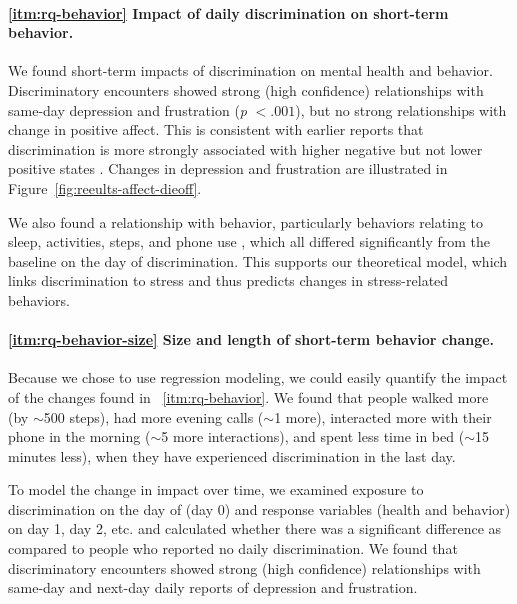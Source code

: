 \paragraph{\ref{itm:rq-behavior} Impact of daily discrimination on short-term behavior.} We found short-term impacts of discrimination on mental health and behavior. Discriminatory encounters showed strong (high confidence) relationships with same-day depression and frustration (\textit{p} $<.001$), but no strong relationships with change in positive affect. This is consistent with earlier reports that discrimination is more strongly associated with higher negative but not lower positive states \citep{Schmitt:2014}. Changes in depression and frustration are illustrated in Figure~\ref{fig:reeults-affect-dieoff}.  

We also found a relationship with behavior, particularly behaviors relating to sleep, activities, steps, and phone use , which all differed significantly from the baseline on the day of discrimination. This supports our theoretical model, which links discrimination to stress and thus predicts changes in stress-related behaviors. 

\paragraph{\ref{itm:rq-behavior-size} Size and length of short-term behavior change.}

Because we chose to use regression modeling, we could easily quantify the impact of the changes found in ~\ref{itm:rq-behavior}. We found that people walked more (by $\sim$500 steps), had more evening calls ($\sim$1 more), interacted more with their phone in the morning ($\sim$5 more interactions), and spent less time in bed ($\sim$15 minutes less), when they have experienced discrimination in the last day. 

To model the change in impact over time, we examined exposure to discrimination on the day of (day 0) and response variables (health and behavior) on day 1, day 2, etc. and calculated whether there was a significant difference as compared to people who reported no daily discrimination.  We found that discriminatory encounters showed strong (high confidence) relationships with same-day and next-day daily reports of depression and frustration. 

